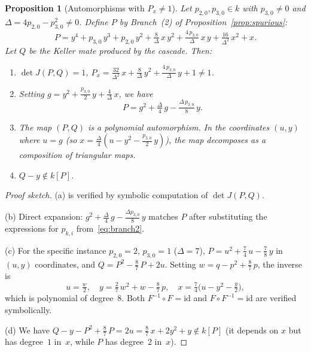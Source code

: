 \documentclass[12pt,a4paper]{article}
\newtheorem{proposition}[theorem]{Proposition}
\theoremstyle{definition}
\newcommand{\kk}{k}
\begin{document}
\begin{proposition}[Automorphisms with $P_x \neq 1$]%
\label{prop:px-neq-1-auto}
Let $p_{2,0}, p_{3,0} \in \kk$ with $p_{3,0} \neq 0$ and
$\Delta = 4p_{2,0} - p_{3,0}^2 \neq 0$. Define $P$ by
Branch~\textup{(2)} of Proposition~\textup{\ref{prop:spurious}}:
\[
  P = y^4 + p_{3,0}\,y^3 + p_{2,0}\,y^2
    + \tfrac{8}{\Delta}\,x\,y^2 + \tfrac{4\,p_{3,0}}{\Delta}\,x\,y
    + \tfrac{16}{\Delta^2}\,x^2 + x.
\]
Let $Q$ be the Keller mate produced by the cascade. Then:
\begin{enumerate}
\item[\textup{(a)}] $\det J(P,Q) = 1$,
  \quad $P_x = \tfrac{32}{\Delta^2}\,x + \tfrac{8}{\Delta}\,y^2
  + \tfrac{4\,p_{3,0}}{\Delta}\,y + 1 \neq 1$.
\item[\textup{(b)}] Setting $g = y^2 + \tfrac{p_{3,0}}{2}\,y
  + \tfrac{4}{\Delta}\,x$, we have
  \[
    P = g^2 + \tfrac{\Delta}{4}\,g - \tfrac{\Delta\,p_{3,0}}{8}\,y.
  \]
\item[\textup{(c)}] The map $(P,Q)$ is a polynomial automorphism.
  In the coordinates $(u,y)$ where $u = g$ \textup{(}so
  $x = \tfrac{\Delta}{4}(u - y^2 - \tfrac{p_{3,0}}{2}\,y)$\textup{)},
  the map decomposes as a composition of triangular maps.
\item[\textup{(d)}] $Q - y \notin \kk[P]$.
\end{enumerate}
\end{proposition}

\begin{proof}[Proof sketch]
(a) is verified by symbolic computation of $\det J(P,Q)$.

(b) Direct expansion: $g^2 + \tfrac{\Delta}{4}\,g - \tfrac{\Delta p_{3,0}}{8}\,y$
matches $P$ after substituting the expressions for $p_{k,i}$
from~\eqref{eq:branch2}.

(c) For the specific instance $p_{2,0} = 2$, $p_{3,0} = 1$ ($\Delta = 7$),
$P = u^2 + \tfrac{7}{4}\,u - \tfrac{7}{8}\,y$ in $(u,y)$ coordinates,
and $Q = P^2 - \tfrac{8}{7}\,P + 2u$. Setting $w = q - p^2 + \tfrac{8}{7}\,p$,
the inverse is
\[
  u = \tfrac{w}{2}, \quad
  y = \tfrac{2}{7}\,w^2 + w - \tfrac{8}{7}\,p, \quad
  x = \tfrac{7}{4}\bigl(u - y^2 - \tfrac{y}{2}\bigr),
\]
which is polynomial of degree~$8$. Both $F^{-1} \circ F = \mathrm{id}$
and $F \circ F^{-1} = \mathrm{id}$ are verified symbolically.

(d) We have $Q - y - P^2 + \tfrac{8}{7}\,P = 2u
= \tfrac{8}{7}\,x + 2y^2 + y \notin \kk[P]$
(it depends on $x$ but has degree~$1$ in~$x$, while $P$ has degree~$2$
in~$x$).
\end{proof}
\end{document}

